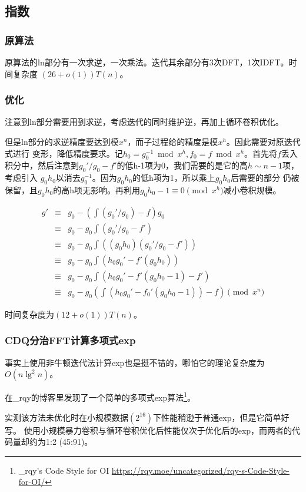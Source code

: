 \subsection{指数}
\subsubsection{原算法}
原算法的ln部分有一次求逆，一次乘法。迭代其余部分有3次DFT，1次IDFT。时间复杂度
$(26+o(1))T(n)$。
\subsubsection{优化}
注意到ln部分需要用到求逆，考虑迭代的同时维护逆，再加上循环卷积优化。

但是ln部分的求逆精度要达到模$x^n$，而子过程给的精度是模$x^h$。因此需要对原迭代式进行
变形，降低精度要求。记$h_0=g_0^{-1}\bmod{x^h},f_0=f\bmod{x^h}$。首先将$f$丢入
积分中，然后注意到$g_0'/g_0-f'$的低h-1项为0，我们需要的是它的高$h\sim n-1$项，考虑引入
$g_0h_0$以消去$g_0^{-1}$。因为$g_0h_0$的低h项为1，所以乘上$g_0h_0$后需要的部分
仍被保留，且$g_0h_0$的高h项无影响。再利用$g_0h_0-1\equiv 0 \pmod{x^h}$减小卷积规模。

\begin{eqnarray*}
    g'&\equiv&g_0-(\int(g_0'/g_0)-f)g_0\\
    &\equiv&g_0-g_0\int(g_0'/g_0-f')\\
    &\equiv&g_0-g_0\int((g_0h_0)(g_0'/g_0-f'))\\
    &\equiv&g_0-g_0\int(h_0g_0'-f'(g_0h_0))\\
    &\equiv&g_0-g_0\int(h_0g_0'-f'(g_0h_0-1)-f')\\
    &\equiv&g_0-g_0(\int(h_0g_0'-f_0'(g_0h_0-1))-f) \pmod{x^n}
\end{eqnarray*}

时间复杂度为$(12+o(1))T(n)$。
\subsubsection{CDQ分治FFT计算多项式exp}
事实上使用非牛顿迭代法计算exp也是挺不错的，哪怕它的理论复杂度为$O(n\lg^2n)$。

在\_rqy的博客里发现了一个简单的多项式exp算法\footnote{
    \_rqy's Code Style for OI
    \url{https://rqy.moe/uncategorized/rqy-s-Code-Style-for-OI/}
}。

实测该方法未优化时在小规模数据$(2^{16})$下性能稍逊于普通exp，但是它简单好写。
使用小规模暴力卷积与循环卷积优化后性能仅次于优化后的exp，而两者的代码量却约为1:2
(45:91)。

